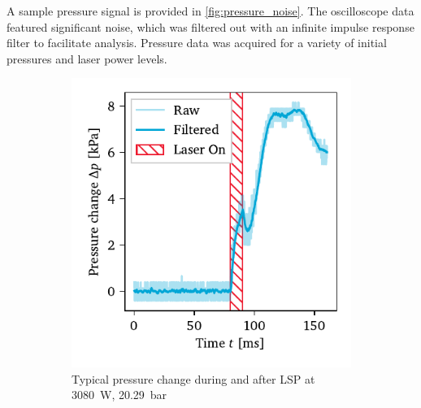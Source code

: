             A sample pressure signal is provided in \autoref{fig:pressure_noise}. The oscilloscope data featured significant noise, which was filtered out with an infinite impulse response filter to facilitate analysis. Pressure data was acquired for a variety of initial pressures and laser power levels.

            \begin{figure}[h]
                \centering
                \begin{subfigure}[t]{0.47\textwidth}
                    \centering
                    \includegraphics[width=\textwidth]{assets/5 results/pressure_noise}
                    \caption{Typical pressure change during and after LSP at \qty{3080}{W}, \qty{20.29}{bar}}
                    \label{fig:pressure_noise}
                \end{subfigure}
                \hfill
                \begin{subfigure}[t]{0.47\textwidth}
                    \centering

\end{subfigure}
\end{figure}
